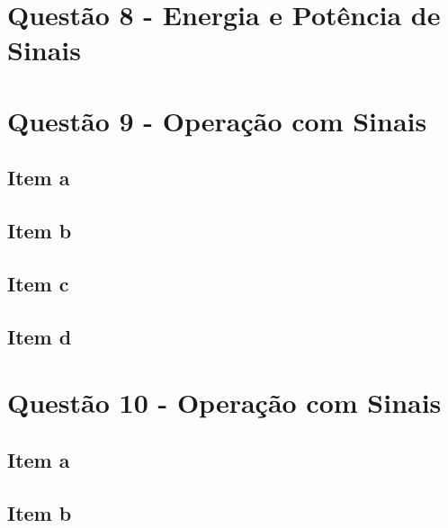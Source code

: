 \documentclass[a4paper, 12pt]{article}
\begin{document}
    \section{Quest\~{a}o 8 - Energia e Potência de Sinais}
    \section{Quest\~{a}o 9 - Operação com Sinais}
        \subsection{Item a}
        \subsection{Item b}
        \subsection{Item c}
        \subsection{Item d}
    \section{Quest\~{a}o 10 - Operação com Sinais}
        \subsection{Item a}
        \subsection{Item b}
\end{document}
